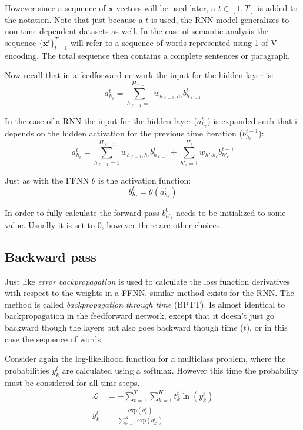 However since a sequence of $\mathbf{x}$ vectors will be used later, a $t \in [1, T]$ is added to the notation. Note that just because a $t$ is used, the RNN model generalizes to non-time dependent datasets as well. In the case of semantic analysis the sequence $\{\mathbf{x}^t\}_{t=1}^T$ will refer to a sequence of words represented using 1-of-V encoding. The total sequence then contains a complete sentences or paragraph. 

Now recall that in a feedforward network the input for the hidden layer is:
\begin{equation}
a_{h_\ell}^t = \sum_{h_{\ell-1}=1}^{H_{\ell-1}} w_{h_{\ell-1}, h_\ell} b_{h_{\ell-1}}^t
\end{equation}

In the case of a RNN the input for the hidden layer ($a_{h_\ell}^t$) is expanded such that i depends on the hidden activation for the previous time iteration ($b_{h_\ell}^{t-1}$):
\begin{equation}
a_{h_\ell}^t = \sum_{h_{\ell-1}=1}^{H_{\ell-1}} w_{h_{\ell-1}, h_\ell} b_{h_{\ell-1}}^t + \sum_{h'_\ell=1}^{H_\ell} w_{h'_\ell h_\ell} b_{h'_\ell}^{t-1}
\end{equation}

Just as with the FFNN $\theta$ is the activation function:
\begin{equation}
b_{h_\ell}^t = \theta(a_{h_\ell}^t)
\end{equation}

In order to fully calculate the forward pass $b_{h'_\ell}^0$ needs to be initialized to some value. Usually it is set to $0$, however there are other choices.

\subsection{Backward pass}

Just like \textit{error backpropagation} is used to calculate the loss function derivatives with respect to the weights in a FFNN, similar method exists for the RNN. The method is called \textit{backpropagation through time} (BPTT). Is almost identical to backpropagation in the feedforward network, except that it doesn't just go backward though the layers but also goes backward though time ($t$), or in this case the sequence of words.

Consider again the log-likelihood function for a multiclass problem, where the probabilities $y_k^t$ are calculated using a softmax. However this time the probability must be considered for all time steps.
\begin{align}
\mathcal{L} &= - \sum_{t=1}^T \sum_{k=1}^K t_k^t \ln(y_k^t) \\
y_k^t &= \frac{\mathrm{exp}(a_k^t)} {\sum_{k'=1}^K \mathrm{exp}(a_{k'}^t)}
\end{align}

